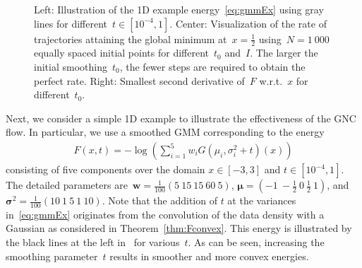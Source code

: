\documentclass{article}
\theoremstyle{plain}
\theoremstyle{definition}
\theoremstyle{remark}
\begin{document}
\begin{figure}[th]
\centering
{}
\label{fig:gmmOptimization}
\caption{Left: Illustration of the 1D example energy~\eqref{eq:gmmEx} using gray lines for different~$t\in[10^{-4},1]$.
Center: Visualization of the rate of trajectories attaining the global minimum at~$x=\frac{1}{2}$ using~$N=1\ 000$ equally spaced initial points for different~$t_0$ and~$I$.
The larger the initial smoothing~$t_0$, the fewer steps are required to obtain the perfect rate.
Right: Smallest second derivative of~$F$ w.r.t.~$x$ for different~$t_0$.
}
\end{figure}
Next, we consider a simple 1D example to illustrate the effectiveness of the GNC flow.
In particular, we use a smoothed GMM corresponding to the energy
\begin{align} \label{eq:gmmEx}
F(x,t)=-\log\left(\sum_{i=1}^5 w_i G\left(\mu_i,\sigma_i^2+t\right)(x)\right)
\end{align}
consisting of five components over the domain $x\in[-3,3]$ and $t\in[10^{-4},1]$.
The detailed parameters are~$\bm{w}=\tfrac{1}{100}(5\ 15\ 15\ 60\ 5)$, $\bm{\mu}=(-1\ -\tfrac12\ 0\ \tfrac12\ 1)$, and $\bm{\sigma}^2=\tfrac{1}{100}(10\ 1\ 5\ 1\ 10)$.
Note that the addition of $t$ at the variances in~\eqref{eq:gmmEx} originates from the convolution of the data density with a Gaussian as considered in Theorem~\ref{thm:Fconvex}.
This energy is illustrated by the black lines at the left in~ for various~$t$.
As can be seen, increasing the smoothing parameter~$t$ results in smoother and more convex energies.
\end{document}
